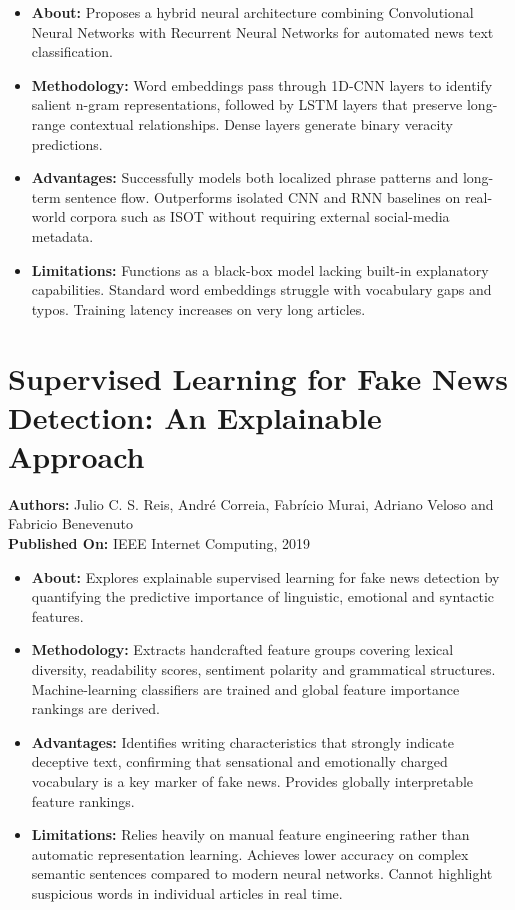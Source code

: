 \documentclass[12pt,a4paper,oneside]{report}
\begin{document}
\begin{itemize}[leftmargin=*, itemsep=2pt]
  \item \textbf{About:} Proposes a hybrid neural architecture combining Convolutional
        Neural Networks with Recurrent Neural Networks for automated news text
        classification.
  \item \textbf{Methodology:} Word embeddings pass through 1D-CNN layers to identify
        salient n-gram representations, followed by LSTM layers that preserve long-range
        contextual relationships. Dense layers generate binary veracity predictions.
  \item \textbf{Advantages:} Successfully models both localized phrase patterns and
        long-term sentence flow. Outperforms isolated CNN and RNN baselines on real-world
        corpora such as ISOT without requiring external social-media metadata.
  \item \textbf{Limitations:} Functions as a black-box model lacking built-in
        explanatory capabilities. Standard word embeddings struggle with vocabulary gaps
        and typos. Training latency increases on very long articles.
\end{itemize}

\section{Supervised Learning for Fake News Detection: An Explainable Approach}
\textbf{Authors:} Julio C. S. Reis, Andr\'{e} Correia, Fabr\'{i}cio Murai, Adriano Veloso and Fabricio Benevenuto\\
\textbf{Published On:} IEEE Internet Computing, 2019

\begin{itemize}[leftmargin=*, itemsep=2pt]
  \item \textbf{About:} Explores explainable supervised learning for fake news detection
        by quantifying the predictive importance of linguistic, emotional and syntactic
        features.
  \item \textbf{Methodology:} Extracts handcrafted feature groups covering lexical
        diversity, readability scores, sentiment polarity and grammatical structures.
        Machine-learning classifiers are trained and global feature importance rankings
        are derived.
  \item \textbf{Advantages:} Identifies writing characteristics that strongly indicate
        deceptive text, confirming that sensational and emotionally charged vocabulary is
        a key marker of fake news. Provides globally interpretable feature rankings.
  \item \textbf{Limitations:} Relies heavily on manual feature engineering rather than
        automatic representation learning. Achieves lower accuracy on complex semantic
        sentences compared to modern neural networks. Cannot highlight suspicious words
        in individual articles in real time.
\end{itemize}
\end{document}

